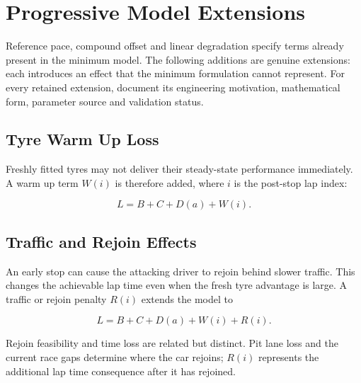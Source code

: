 \section{Progressive Model Extensions}
\label{sec:model-extensions}

Reference pace, compound offset and linear degradation specify terms already
present in the minimum model. The following additions are genuine extensions:
each introduces an effect that the minimum formulation cannot represent. For
every retained extension, document its engineering motivation, mathematical
form, parameter source and validation status.

\subsection{Tyre Warm Up Loss}
\label{subsec:warmup-model}

Freshly fitted tyres may not deliver their steady-state performance immediately.
A warm up term $W(i)$ is therefore added, where $i$ is the post-stop lap index:

\begin{equation}
L=B+C+D(a)+W(i).
\label{eq:model-plus-warmup}
\end{equation}


\subsection{Traffic and Rejoin Effects}
\label{subsec:traffic-model}

An early stop can cause the attacking driver to rejoin behind slower traffic.
This changes the achievable lap time even when the fresh tyre advantage is
large. A traffic or rejoin penalty $R(i)$ extends the model to

\begin{equation}
L=B+C+D(a)+W(i)+R(i).
\label{eq:model-plus-traffic}
\end{equation}

Rejoin feasibility and time loss are related but distinct. Pit lane loss and
the current race gaps determine where the car rejoins; $R(i)$ represents the
additional lap time consequence after it has rejoined.

